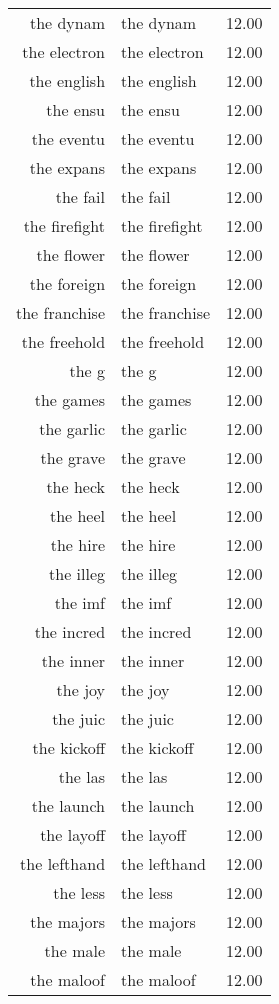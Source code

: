\begin{table}[ht]
\begin{tabular}{rlr}
  the dynam & the dynam & 12.00 \\ 
  the electron & the electron & 12.00 \\ 
  the english & the english & 12.00 \\ 
  the ensu & the ensu & 12.00 \\ 
  the eventu & the eventu & 12.00 \\ 
  the expans & the expans & 12.00 \\ 
  the fail & the fail & 12.00 \\ 
  the firefight & the firefight & 12.00 \\ 
  the flower & the flower & 12.00 \\ 
  the foreign & the foreign & 12.00 \\ 
  the franchise & the franchise & 12.00 \\ 
  the freehold & the freehold & 12.00 \\ 
  the g & the g & 12.00 \\ 
  the games & the games & 12.00 \\ 
  the garlic & the garlic & 12.00 \\ 
  the grave & the grave & 12.00 \\ 
  the heck & the heck & 12.00 \\ 
  the heel & the heel & 12.00 \\ 
  the hire & the hire & 12.00 \\ 
  the illeg & the illeg & 12.00 \\ 
  the imf & the imf & 12.00 \\ 
  the incred & the incred & 12.00 \\ 
  the inner & the inner & 12.00 \\ 
  the joy & the joy & 12.00 \\ 
  the juic & the juic & 12.00 \\ 
  the kickoff & the kickoff & 12.00 \\ 
  the las & the las & 12.00 \\ 
  the launch & the launch & 12.00 \\ 
  the layoff & the layoff & 12.00 \\ 
  the lefthand & the lefthand & 12.00 \\ 
  the less & the less & 12.00 \\ 
  the majors & the majors & 12.00 \\ 
  the male & the male & 12.00 \\ 
  the maloof & the maloof & 12.00 \\ 

\end{tabular}
\end{table}

